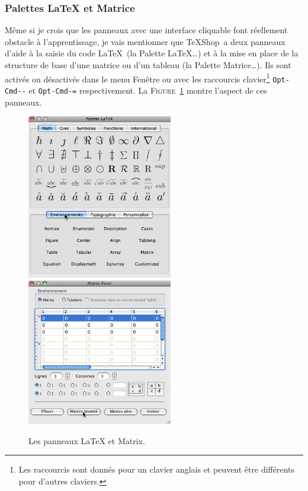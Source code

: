 \documentclass[11pt,french]{article}
\newcommand{\TS}{\textsf{\TeX Shop}}
\newcommand{\mnu}[1]{\textsf{#1}}
\begin{document}
\subsubsection{Palettes LaTeX et Matrice}

Même si je crois que les panneaux avec une interface cliquable font réellement obstacle à l'apprentissage, je vais mentionner que \TS\ a deux panneaux d'aide à la saisie du code \LaTeX\ (la \mnu{Palette LaTeX…}) et à la mise en place de la structure de base d'une matrice ou d'un tableau (la \mnu{Palette Matrice…}). Ils sont activés ou désactivés dans le menu \mnu{Fenêtre} ou avec les raccourcis clavier\footnote{Les raccourcis sont donnés pour un clavier anglais et peuvent être différents pour d'autres claviers.} \texttt{Opt-Cmd-{}-} et \texttt{Opt-Cmd-=} respectivement. La \textsc{Figure}~\ref{fig:LandMPanels} montre l'aspect de ces panneaux.
\begin{figure}
\includegraphics[width=2.5in]{figs/palette}\hfill\includegraphics[width=2.5in]
{figs/matrice}
\caption{Les panneaux LaTeX et Matrix.\label{fig:LandMPanels}}
\end{figure}
\end{document}
